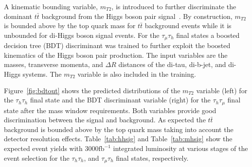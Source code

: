 \begin{table}[!ht]
\begin{center} 
\caption{ Event selection summary for the $b\bar{b}\tau^{+}\tau^{-}$ final state.}
\label{tab:event_selection}
\end{center}
\end{table}

A kinematic bounding variable, $m_{T2}$, is introduced to further
discriminate the dominant $t\bar{t}$ background from the Higgs boson pair signal~\cite{smt}. By construction, $m_{T2}$ is 
bounded above by the top quark mass for $t\bar{t}$ background events
while it is unbounded for di-Higgs boson signal events. For the
$\tau_{\mu}\tau_{h}$ final states a boosted decision tree (BDT) discriminant was trained to further exploit the boosted kinematics of the Higgs boson pair production. The input variables are the masses, transverse momenta, and $\Delta R$ distances of the di-tau, di-b-jet, and di-Higgs systems. The $m_{T2}$ variable is also included in the training.

Figure~\ref{fig:bdtout} shows the predicted distributions of the $m_{T2}$ variable (left) for the $\tau_{h}\tau_{h}$ final state and the BDT discriminant variable (right) for the $\tau_{h}\tau_{\mu}$ final state after the mass window requirements. Both variables provide good discrimination between the signal and background. As expected the $t\bar{t}$ background is bounded above by the top quark mass taking into account the detector resolution effects. Table~\ref{tab:hhsig} and Table~\ref{tab:mhsig} show the expected event yields with $3000 \mathrm{fb}^{-1}$ integrated luminosity at various stages of the event selection for the $\tau_{h}\tau_{h}$, and $\tau_{\mu}\tau_{h}$ final states, respectively. 

